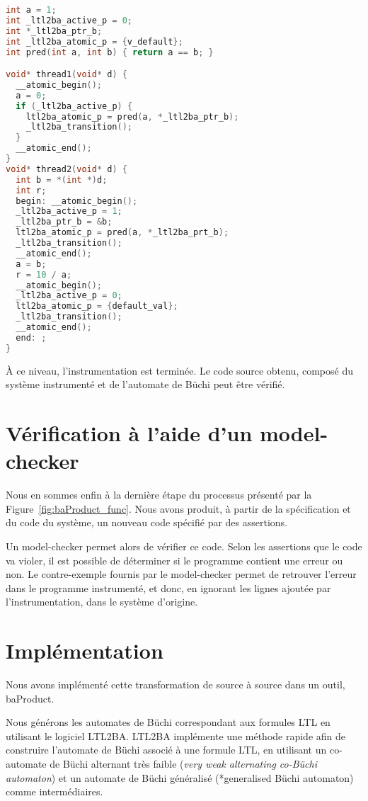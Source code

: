 \begin{lstlisting}[language=C, frame=single, caption=Instrumentation finale pour
  des variables locales et globales]
int a = 1;
int _ltl2ba_active_p = 0;
int *_ltl2ba_ptr_b;
int _ltl2ba_atomic_p = {v_default};
int pred(int a, int b) { return a == b; }

void* thread1(void* d) {
  __atomic_begin();
  a = 0;
  if (_ltl2ba_active_p) {
    ltl2ba_atomic_p = pred(a, *_ltl2ba_ptr_b);
    _ltl2ba_transition();
  }
  __atomic_end();
}
void* thread2(void* d) {
  int b = *(int *)d;
  int r;
  begin: __atomic_begin();
  _ltl2ba_active_p = 1;
  _ltl2ba_ptr_b = &b;
  ltl2ba_atomic_p = pred(a, *_ltl2ba_prt_b);
  _ltl2ba_transition();
  __atomic_end();
  a = b;
  r = 10 / a;
  __atomic_begin();
  _ltl2ba_active_p = 0;
  ltl2ba_atomic_p = {default_val};
  _ltl2ba_transition();
  __atomic_end();
  end: ;
}
\end{lstlisting}

À ce niveau, l'instrumentation est terminée. Le code source obtenu, composé du
système instrumenté et de l'automate de Büchi peut être vérifié.

\section{Vérification à l'aide d'un model-checker}

Nous en sommes enfin à la dernière étape du processus présenté par la
Figure~\ref{fig:baProduct_func}. Nous avons produit, à partir de la
spécification et du code du système, un nouveau code spécifié par des
assertions.

Un model-checker permet alors de vérifier ce code. Selon les assertions que le
code va violer, il est possible de déterminer si le programme contient une
erreur ou non. Le contre-exemple fournis par le model-checker permet de
retrouver l'erreur dans le programme instrumenté, et donc, en ignorant les
lignes ajoutée par l'instrumentation, dans le système d'origine.

\section{Implémentation}

Nous avons implémenté cette transformation de source à source dans un outil,
baProduct.

Nous générons les automates de Büchi correspondant aux formules LTL en
utilisant le logiciel LTL2BA\cite{ltl2ba}. LTL2BA implémente
une méthode rapide afin de construire l'automate de Büchi associé à une
formule LTL, en utilisant un co-automate de Büchi alternant très faible
(\emph{very weak alternating co-Büchi automaton}) et un automate de
Büchi généralisé (*generalised Büchi automaton) comme intermédiaires.

